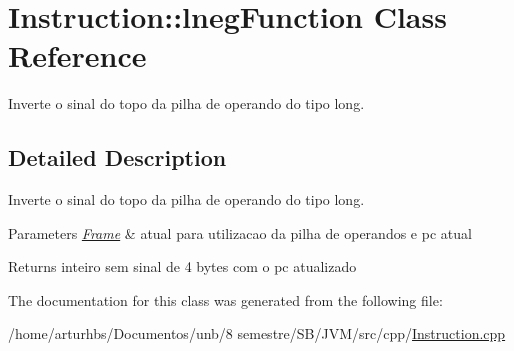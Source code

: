 \hypertarget{classInstruction_1_1lnegFunction}{}\section{Instruction\+:\+:lneg\+Function Class Reference}
\label{classInstruction_1_1lnegFunction}


Inverte o sinal do topo da pilha de operando do tipo long.  




\subsection{Detailed Description}
Inverte o sinal do topo da pilha de operando do tipo long. 


\begin{DoxyParams}{Parameters}
{\em \hyperlink{classFrame}{Frame}} & atual para utilizacao da pilha de operandos e pc atual \\
\hline
\end{DoxyParams}
\begin{DoxyReturn}{Returns}
inteiro sem sinal de 4 bytes com o pc atualizado 
\end{DoxyReturn}


The documentation for this class was generated from the following file\+:\begin{DoxyCompactItemize}
\item 
/home/arturhbs/\+Documentos/unb/8 semestre/\+S\+B/\+J\+V\+M/src/cpp/\hyperlink{Instruction_8cpp}{Instruction.\+cpp}\end{DoxyCompactItemize}
